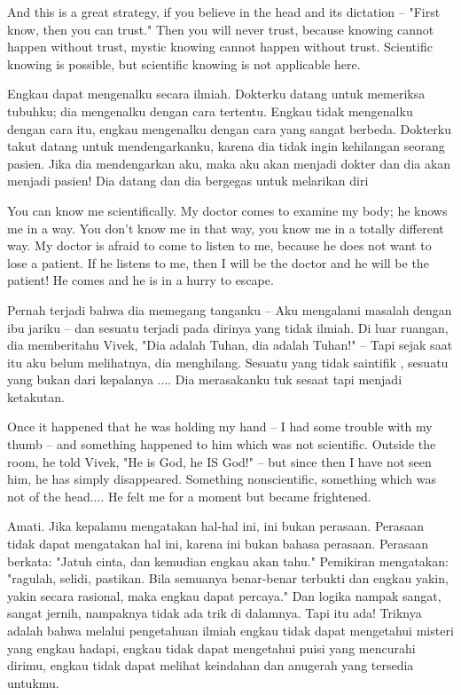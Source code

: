 \english
And this is a great strategy, if you believe in the head and its dictation -- "First know, then you can trust." Then you will never trust, because knowing cannot happen without trust, mystic knowing cannot happen without trust. Scientific knowing is possible, but scientific knowing is not applicable here.

\bahasa
Engkau dapat mengenalku secara ilmiah. Dokterku datang untuk memeriksa tubuhku; dia mengenalku dengan cara tertentu. Engkau tidak mengenalku dengan cara itu, engkau mengenalku dengan cara yang sangat berbeda. Dokterku takut datang untuk mendengarkanku, karena dia tidak ingin kehilangan seorang pasien. Jika dia mendengarkan aku, maka aku akan menjadi dokter dan dia akan menjadi pasien! Dia datang dan dia bergegas untuk melarikan diri

\english
You can know me scientifically. My doctor comes to examine my body; he knows me in a way. You don't know me in that way, you know me in a totally different way. My doctor is afraid to come to listen to me, because he does not want to lose a patient. If he listens to me, then I will be the doctor and he will be the patient! He comes and he is in a hurry to escape.

\bahasa
Pernah terjadi bahwa dia memegang tanganku -- Aku mengalami masalah dengan ibu jariku -- dan sesuatu terjadi pada dirinya yang tidak ilmiah. Di luar ruangan, dia memberitahu Vivek, "Dia adalah Tuhan, dia adalah Tuhan!" -- Tapi sejak saat itu aku belum melihatnya, dia menghilang. Sesuatu yang tidak saintifik , sesuatu yang bukan dari kepalanya .... Dia merasakanku tuk sesaat tapi menjadi ketakutan.

\english
Once it happened that he was holding my hand -- I had some trouble with my thumb -- and something happened to him which was not scientific. Outside the room, he told Vivek, "He is God, he IS God!" -- but since then I have not seen him, he has simply disappeared. Something nonscientific, something which was not of the head.... He felt me for a moment but became frightened.

\bahasa
Amati. Jika kepalamu mengatakan hal-hal ini, ini bukan perasaan. Perasaan tidak dapat mengatakan hal ini, karena ini bukan bahasa perasaan. Perasaan berkata: "Jatuh cinta, dan kemudian engkau akan tahu." Pemikiran mengatakan: "ragulah, selidi, pastikan. Bila semuanya benar-benar terbukti dan engkau yakin, yakin secara rasional, maka engkau dapat percaya." Dan logika nampak sangat, sangat jernih, nampaknya tidak ada trik di dalamnya. Tapi itu ada! Triknya adalah bahwa melalui pengetahuan ilmiah engkau tidak dapat mengetahui misteri yang engkau hadapi, engkau tidak dapat mengetahui puisi yang mencurahi dirimu, engkau tidak dapat melihat keindahan dan anugerah yang tersedia untukmu.

